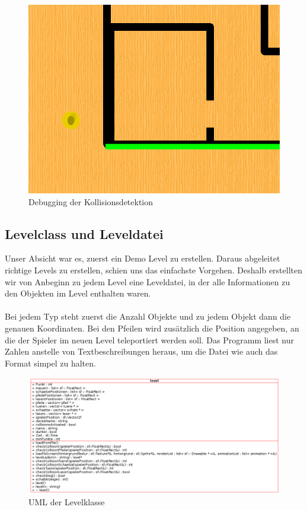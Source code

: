 \documentclass[11pt,a4paper]{scrbook}
\begin{document}
\begin{figure}[h]
\centering
\includegraphics[scale=0.3]{img/kollisionsdetektion.png}
\caption{Debugging der Kollisionsdetektion}
\end{figure}

\subsection{Levelclass und Leveldatei}
Unser Absicht war es, zuerst ein Demo Level zu erstellen. Daraus abgeleitet richtige Levels zu erstellen, schien uns das einfachste Vorgehen. 
Deshalb erstellten wir von Anbeginn zu jedem Level eine Leveldatei, in der alle Informationen zu den Objekten im Level enthalten waren.\\
\\
Bei jedem Typ steht zuerst die Anzahl Objekte und zu jedem Objekt dann die genauen Koordinaten. 
Bei den Pfeilen wird zusätzlich die Position angegeben, an die der Spieler im neuen Level teleportiert werden soll. 
Das Programm liest nur Zahlen anstelle von Textbeschreibungen heraus, um die Datei wie auch das Format simpel zu halten.


\begin{figure}[h]
\centering
\includegraphics[scale=0.45]{img/level_uml.png}
\caption{UML der Levelklasse}
\end{figure}
\end{document}
